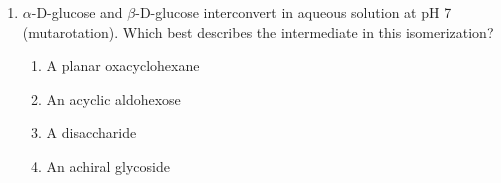 \documentclass[twocolumn,10pt]{article}
\begin{document}
\begin{enumerate}[label=\arabic*., leftmargin=*]
\item $\alpha$-D-glucose and $\beta$-D-glucose interconvert in aqueous solution at pH 7 (mutarotation). Which best describes the intermediate in this isomerization?
\begin{enumerate}[label=(\Alph*)]
    \item A planar oxacyclohexane
    \item An acyclic aldohexose
    \item A disaccharide
    \item An achiral glycoside
\end{enumerate}

\end{enumerate}
\end{document}

